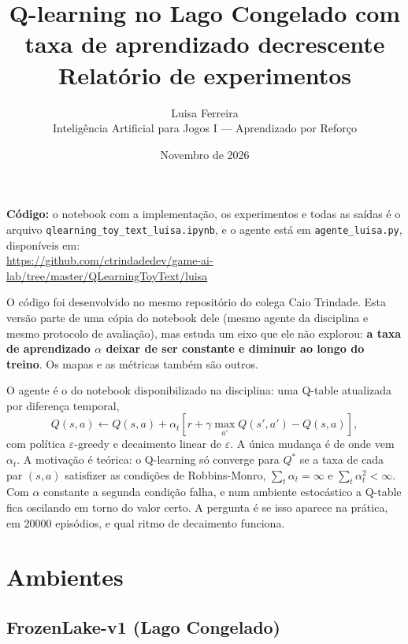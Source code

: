 \documentclass[11pt,a4paper]{article}
\title{\textbf{Q-learning no Lago Congelado com taxa de aprendizado decrescente}\\[0.3em]
  \large Relatório de experimentos}
\author{Luisa Ferreira\\
  \small Inteligência Artificial para Jogos I --- Aprendizado por Reforço}
\date{Novembro de 2026}
\begin{document}
\maketitle

\textbf{Código:} o notebook com a implementação, os experimentos e todas as saídas é o arquivo
\texttt{qlearning\_toy\_text\_luisa.ipynb}, e o agente está em \texttt{agente\_luisa.py}, disponíveis em:\\
\url{https://github.com/ctrindadedev/game-ai-lab/tree/master/QLearningToyText/luisa}

O código foi desenvolvido no mesmo repositório do colega Caio Trindade. Esta versão parte de uma cópia do notebook dele
(mesmo agente da disciplina e mesmo protocolo de avaliação), mas estuda um eixo que ele não explorou: \textbf{a taxa
de aprendizado $\alpha$ deixar de ser constante e diminuir ao longo do treino}. Os mapas e as métricas também são
outros.

O agente é o do notebook disponibilizado na disciplina: uma Q-table atualizada por diferença temporal,
\[
Q(s,a) \leftarrow Q(s,a) + \alpha_t\left[r + \gamma \max_{a'} Q(s',a') - Q(s,a)\right],
\]
com política $\varepsilon$-greedy e decaimento linear de $\varepsilon$. A única mudança é de onde vem $\alpha_t$.
A motivação é teórica: o Q-learning só converge para $Q^*$ se a taxa de cada par $(s,a)$ satisfizer as condições de
Robbins-Monro, $\sum_t \alpha_t = \infty$ e $\sum_t \alpha_t^2 < \infty$. Com $\alpha$ constante a segunda condição falha, e
num ambiente estocástico a Q-table fica oscilando em torno do valor certo. A pergunta é se isso aparece na prática, em
20000 episódios, e qual ritmo de decaimento funciona.

\section{Ambientes}

\subsection*{FrozenLake-v1 (Lago Congelado)}
\end{document}
